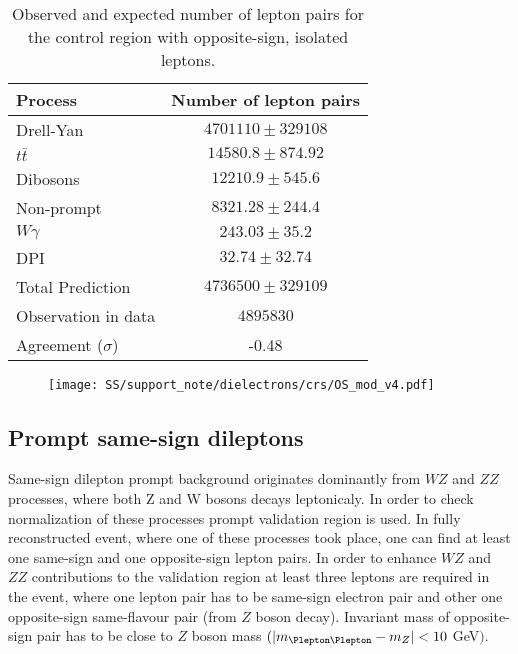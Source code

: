 \begin{table}[htbp]
\caption{Observed and expected number of lepton pairs for the control region with opposite-sign, isolated leptons.} %
\begin{center}
\begin{tabular}{l|c}

Process & Number of lepton pairs \\\hline\hline
        Drell-Yan	& $ 4701110 \pm 329108 $	\\[+0.05in]
	$t\bar{t}$	& $ 14580.8 \pm 874.92 $	\\[+0.05in]
	Dibosons	& $ 12210.9 \pm 545.6 $	\\[+0.05in]
	Non-prompt	& $ 8321.28 \pm 244.4 $	\\[+0.05in]
	$W\gamma$	& $ 243.03 \pm 35.2 $	\\[+0.05in]
	DPI	& $ 32.74 \pm 32.74 $	\\[+0.05in]
	\hline
	Total Prediction	& $ 4736500 \pm 329109 $	\\[+0.05in]
	\hline
	Observation in data	& $ 4895830 $	\\[+0.05in]
	\hline
	Agreement ($\sigma$) & -0.48 \\[+0.05in]

\hline  
\end{tabular}
\end{center}
\label{tab:dilep_isoOS}
\end{table}

\begin{figure}[h]
\begin{center}
\texttt{[image: SS/support\_note/dielectrons/crs/OS\_mod\_v4.pdf]}
\caption{\toDo}
\label{fig:OS_CR}
\end{center}
\end{figure} 



\subsection{Prompt same-sign dileptons}

Same-sign dilepton prompt background originates dominantly from $WZ$ and $ZZ$ processes, where both Z and W bosons decays leptonicaly.
In order to check normalization of these processes prompt validation region is used.
In fully reconstructed event, where one of these processes took place, one can find at least one same-sign and one opposite-sign lepton pairs.
In order to enhance $WZ$ and $ZZ$ contributions to the validation region at least three leptons are required in the event, where one lepton pair
has to be same-sign electron pair and other one opposite-sign same-flavour pair (from $Z$ boson decay). 
Invariant mass of opposite-sign pair has to be close to $Z$ boson mass $(|m_{\Plepton\Plepton} - m_{Z}| < 10$ GeV$)$.

